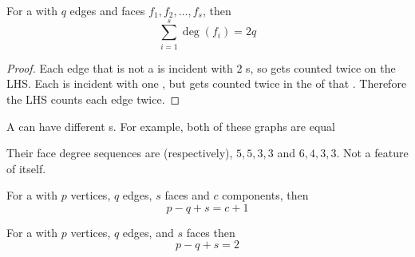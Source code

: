 \documentclass[english, 11pt]{article}
\begin{document}
\begin{thrm}
  For a  with $q$ edges and faces $f_1,f_2,\ldots,f_s$, then
  \[ \sum_{i = 1}^s \deg(f_i) = 2q\]
\end{thrm}
\begin{proof}
  Each edge that is not a  is incident with 2 s, so gets counted twice on the LHS. Each  is incident with one , but gets counted twice in the  of that . Therefore the LHS counts each edge twice.
\end{proof}

A  can have different s. For example, both of these graphs are equal

\begin{center}
\end{center}

Their face degree sequences are (respectively), $5,5,3,3$ and $6,4,3,3$. Not a feature of  itself.

\begin{thrm}\label{eulers}
  For a  with $p$ vertices, $q$ edges, $s$ faces and $c$ components, then
  \[ p - q + s = c + 1 \]
\end{thrm}

\begin{cor}
  For a   with $p$ vertices, $q$ edges, and $s$ faces then
  \[ p - q + s = 2 \]
\end{cor}
\end{document}
